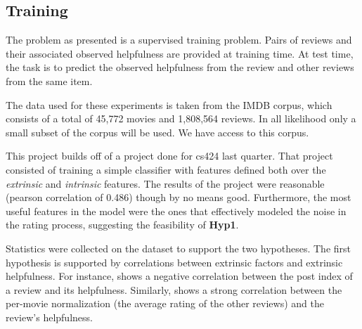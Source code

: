 \documentclass[letter,12pt]{article}
\begin{document}
\subsection{Training}
The problem as presented is a supervised training problem.
Pairs of reviews and their associated observed helpfulness are provided at
	training time.
At test time, the task is to predict the observed helpfulness from the review
	and other reviews from the same item.

The data used for these experiments is taken from the IMDB corpus, which
	consists of a total of 45,772 movies and 1,808,564 reviews.
In all likelihood only a small subset of the corpus will be used.
We have access to this corpus.


This project builds off of a project done for cs424 last quarter.
That project consisted of training a simple classifier with features
	defined both over the {\em extrinsic} and {\em intrinsic} features.
The results of the project were reasonable (pearson correlation of 0.486)
	though by no means good.
Furthermore, the most useful features in the model were the ones that
	effectively modeled the noise in the rating process, suggesting the
	feasibility of {\bf Hyp1}.

Statistics were collected on the dataset to support the two hypotheses.
The first hypothesis is supported by correlations between extrinsic
	factors and extrinsic helpfulness.
For instance,  shows a negative correlation between the
	post index of a review and its helpfulness.
Similarly,  shows a strong correlation between the
	per-movie normalization (the average rating of the other reviews)
	and the review's helpfulness.


\end{document}
